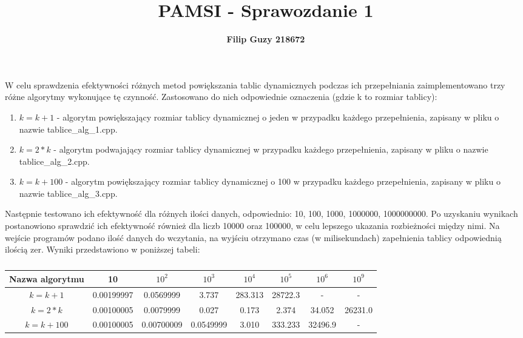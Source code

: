 \documentclass[10pt, a4paper]{article}
\title{\textbf{PAMSI - Sprawozdanie 1}}
\author{\textbf{Filip Guzy 218672}}
\begin{document}
\maketitle

\begin{flushleft}
W celu sprawdzenia efektywności różnych metod powiększania tablic dynamicznych podczas ich przepełniania zaimplementowano trzy różne algorytmy wykonujące tę czynność. Zastosowano do nich odpowiednie oznaczenia (gdzie k to rozmiar tablicy): 
\begin{enumerate}
\item $k=k+1$ - algorytm powiększający rozmiar tablicy dynamicznej o jeden w przypadku każdego przepełnienia, zapisany w pliku o nazwie tablice\_alg\_1.cpp. 
\item $k=2*k$ - algorytm podwajający rozmiar tablicy dynamicznej w przypadku każdego przepełnienia, zapisany w pliku o nazwie tablice\_alg\_2.cpp.
\item $k=k+100$ - algorytm powiększający rozmiar tablicy dynamicznej o 100 w przypadku każdego przepełnienia, zapisany w pliku o nazwie tablice\_alg\_3.cpp.
\end{enumerate}

Następnie testowano ich efektywność dla różnych ilości danych, odpowiednio: 10, 100, 1000, 1000000, 1000000000. Po uzyskaniu wynikach postanowiono sprawdzić ich efektywność również dla liczb 10000 oraz 100000, w celu lepszego ukazania rozbieżności między nimi. Na wejście programów podano ilość danych do wczytania, na wyjściu otrzymano czas (w milisekundach) zapełnienia tablicy odpowiednią ilością zer. Wyniki przedstawiono w poniższej tabeli:

\begin{table}[h]
\centering
\caption{}
\begin{tabular}{|c|c|c|c|c|c|c|c|} \hline
Nazwa algorytmu & 10 & $10^2$ & $10^3$ & $10^4$ & $10^5$ & $10^6$ & $10^9$ \\ \hline
$k=k+1$ & 0.00199997 & 0.0569999 & 3.737 & 283.313 & 28722.3 & - & - \\ \hline
$k=2*k$ & 0.00100005 & 0.0079999 & 0.027 & 0.173 & 2.374 & 34.052 & 26231.0 \\ \hline
$k=k+100$ & 0.00100005 & 0.00700009 & 0.0549999 & 3.010 & 333.233 & 32496.9 & - \\ \hline
\end{tabular}
\end{table}


\end{flushleft}
\end{document}
